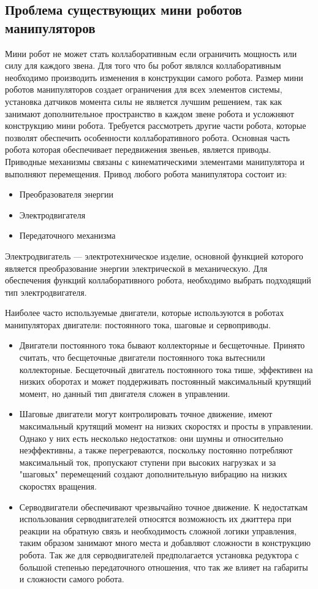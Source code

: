 \subsection{Проблема существующих мини роботов манипуляторов}
Мини робот не может стать коллаборативным если ограничить мощность или силу для каждого звена. Для того что бы робот являлся коллаборативным необходимо производить изменения в конструкции самого робота.
Размер мини роботов манипуляторов создает ограничения для всех элементов системы, установка датчиков момента силы не является лучшим решением, так как занимают дополнительное пространство в каждом звене робота и усложняют конструкцию мини робота. Требуется рассмотреть другие части робота, которые позволят обеспечить особенности коллаборативного робота. Основная часть робота которая обеспечивает передвижения звеньев, является приводы. Приводные механизмы связаны с кинематическими элементами манипулятора и выполняют перемещения.
Привод любого робота манипулятора состоит из:
\begin{itemize}
	\item Преобразователя энергии
	\item Электродвигателя
	\item Передаточного механизма
\end{itemize}

Электродвигатель —  электротехническое изделие, основной функцией которого является преобразование энергии электрической в механическую. Для обеспечения функций коллаборативного робота, необходимо выбрать подходящий тип электродвигателя.

Наиболее часто используемые двигатели, которые используются в роботах манипуляторах двигатели: постоянного тока, шаговые и сервоприводы.
\begin{itemize}
	\item Двигатели постоянного тока бывают коллекторные и бесщеточные. Принято считать, что бесщеточные двигатели постоянного тока вытеснили коллекторные. Бесщеточный двигатель постоянного тока тише, эффективен на низких оборотах и может поддерживать постоянный максимальный крутящий момент, но данный тип двигателя сложен в управлении.
	\item Шаговые двигатели могут контролировать точное движение, имеют максимальный крутящий момент на низких скоростях и просты в управлении. Однако у них есть несколько недостатков: они шумны и относительно неэффективны, а также перегреваются, поскольку постоянно потребляют максимальный ток, пропускают ступени при высоких нагрузках и за "шаговых" перемещений создают дополнительную вибрацию на низких скоростях вращения.
	\item Серводвигатели обеспечивают чрезвычайно точное движение. К недостаткам использования серводвигателей относятся возможность их джиттера при реакции на обратную связь и необходимость сложной логики управления, таким образом занимают много места и добавляют сложности в конструкцию робота. Так же для серводвигателей предполагается установка редуктора с большой степенью передаточного отношения, что так же влияет на габариты и сложности самого робота.
\end{itemize}


